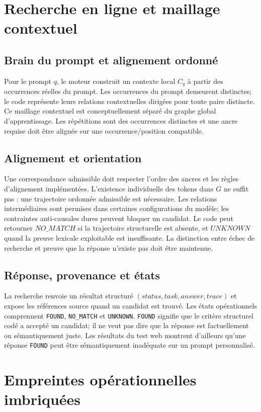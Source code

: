 \documentclass[11pt,a4paper,openany]{book}
\begin{document}
\chapter{Recherche en ligne et maillage contextuel}
\section{Brain du prompt et alignement ordonné}
Pour le prompt $q$, le moteur construit un contexte local $C_q$ à partir des occurrences réelles du prompt. Les occurrences du prompt demeurent distinctes; le code représente leurs relations contextuelles dirigées pour toute paire distincte. Ce maillage contextuel est conceptuellement séparé du graphe global d'apprentissage. Les répétitions sont des occurrences distinctes et une ancre requise doit être alignée sur une occurrence/position compatible.

\section{Alignement et orientation}
Une correspondance admissible doit respecter l'ordre des ancres et les règles d'alignement implémentées. L'existence individuelle des tokens dans $G$ ne suffit pas : une trajectoire ordonnée admissible est nécessaire. Les relations intermédiaires sont permises dans certaines configurations du modèle; les contraintes anti-causales dures peuvent bloquer un candidat. Le code peut retourner $NO\_MATCH$ si la trajectoire structurelle est absente, et $UNKNOWN$ quand la preuve lexicale exploitable est insuffisante. La distinction entre échec de recherche et preuve que la réponse n'existe pas doit être maintenue.

\section{Réponse, provenance et états}
La recherche renvoie un résultat structuré $(status,task,answer,trace)$ et expose les références source quand un candidat est trouvé. Les états opérationnels comprennent \texttt{FOUND}, \texttt{NO\_MATCH} et \texttt{UNKNOWN}. \texttt{FOUND} signifie que le critère structurel codé a accepté un candidat; il ne veut pas dire que la réponse est factuellement ou sémantiquement juste. Les résultats du test web montrent d'ailleurs qu'une réponse \texttt{FOUND} peut être sémantiquement inadéquate sur un prompt personnalisé.

\chapter{Empreintes opérationnelles imbriquées}
\end{document}
